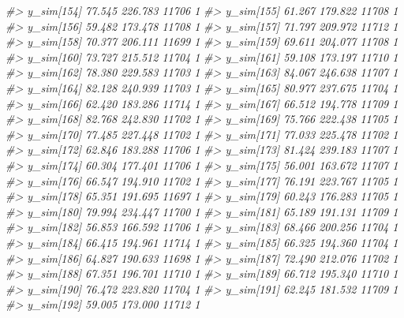 \documentclass[
  10pt,
  italian,
  a4paper,
  extrafontsizes,onecolumn,openright
  ]{memoir}
\newenvironment{Shaded}{\begin{snugshade}}{\end{snugshade}}
\newcommand{\CommentTok}[1]{\textcolor[rgb]{0.56,0.35,0.01}{\textit{#1}}}
\begin{document}
\begin{Shaded}
\begin{Highlighting}[]
\CommentTok{\#\textgreater{} y\_sim[154] 77.545 226.783 11706    1}
\CommentTok{\#\textgreater{} y\_sim[155] 61.267 179.822 11708    1}
\CommentTok{\#\textgreater{} y\_sim[156] 59.482 173.478 11708    1}
\CommentTok{\#\textgreater{} y\_sim[157] 71.797 209.972 11712    1}
\CommentTok{\#\textgreater{} y\_sim[158] 70.377 206.111 11699    1}
\CommentTok{\#\textgreater{} y\_sim[159] 69.611 204.077 11708    1}
\CommentTok{\#\textgreater{} y\_sim[160] 73.727 215.512 11704    1}
\CommentTok{\#\textgreater{} y\_sim[161] 59.108 173.197 11710    1}
\CommentTok{\#\textgreater{} y\_sim[162] 78.380 229.583 11703    1}
\CommentTok{\#\textgreater{} y\_sim[163] 84.067 246.638 11707    1}
\CommentTok{\#\textgreater{} y\_sim[164] 82.128 240.939 11703    1}
\CommentTok{\#\textgreater{} y\_sim[165] 80.977 237.675 11704    1}
\CommentTok{\#\textgreater{} y\_sim[166] 62.420 183.286 11714    1}
\CommentTok{\#\textgreater{} y\_sim[167] 66.512 194.778 11709    1}
\CommentTok{\#\textgreater{} y\_sim[168] 82.768 242.830 11702    1}
\CommentTok{\#\textgreater{} y\_sim[169] 75.766 222.438 11705    1}
\CommentTok{\#\textgreater{} y\_sim[170] 77.485 227.448 11702    1}
\CommentTok{\#\textgreater{} y\_sim[171] 77.033 225.478 11702    1}
\CommentTok{\#\textgreater{} y\_sim[172] 62.846 183.288 11706    1}
\CommentTok{\#\textgreater{} y\_sim[173] 81.424 239.183 11707    1}
\CommentTok{\#\textgreater{} y\_sim[174] 60.304 177.401 11706    1}
\CommentTok{\#\textgreater{} y\_sim[175] 56.001 163.672 11707    1}
\CommentTok{\#\textgreater{} y\_sim[176] 66.547 194.910 11702    1}
\CommentTok{\#\textgreater{} y\_sim[177] 76.191 223.767 11705    1}
\CommentTok{\#\textgreater{} y\_sim[178] 65.351 191.695 11697    1}
\CommentTok{\#\textgreater{} y\_sim[179] 60.243 176.283 11705    1}
\CommentTok{\#\textgreater{} y\_sim[180] 79.994 234.447 11700    1}
\CommentTok{\#\textgreater{} y\_sim[181] 65.189 191.131 11709    1}
\CommentTok{\#\textgreater{} y\_sim[182] 56.853 166.592 11706    1}
\CommentTok{\#\textgreater{} y\_sim[183] 68.466 200.256 11704    1}
\CommentTok{\#\textgreater{} y\_sim[184] 66.415 194.961 11714    1}
\CommentTok{\#\textgreater{} y\_sim[185] 66.325 194.360 11704    1}
\CommentTok{\#\textgreater{} y\_sim[186] 64.827 190.633 11698    1}
\CommentTok{\#\textgreater{} y\_sim[187] 72.490 212.076 11702    1}
\CommentTok{\#\textgreater{} y\_sim[188] 67.351 196.701 11710    1}
\CommentTok{\#\textgreater{} y\_sim[189] 66.712 195.340 11710    1}
\CommentTok{\#\textgreater{} y\_sim[190] 76.472 223.820 11704    1}
\CommentTok{\#\textgreater{} y\_sim[191] 62.245 181.532 11709    1}
\CommentTok{\#\textgreater{} y\_sim[192] 59.005 173.000 11712    1}

\end{Highlighting}
\end{Shaded}
\end{document}
